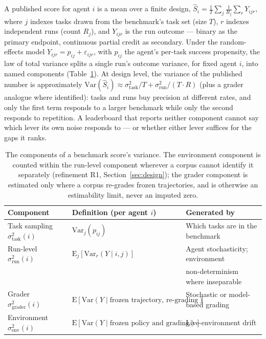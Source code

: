 \documentclass[11pt]{article}
\newcommand{\sT}{\sigma^2_{\mathrm{task}}}
\newcommand{\sR}{\sigma^2_{\mathrm{run}}}
\newcommand{\sG}{\sigma^2_{\mathrm{grader}}}
\begin{document}
A published score for agent $i$ is a mean over a finite design,
$\hat{S}_i = \frac{1}{T}\sum_j \frac{1}{R_j}\sum_r Y_{ijr}$, where $j$
indexes tasks drawn from the benchmark's task set (size $T$), $r$
indexes independent runs (count $R_j$), and $Y_{ijr}$ is the run
outcome --- binary as the primary endpoint, continuous partial credit
as secondary. Under the random-effects model $Y_{ijr} = p_{ij} +
\varepsilon_{ijr}$, with $p_{ij}$ the agent's per-task success
propensity, the law of total variance splits a single run's outcome
variance, for fixed agent $i$, into named components
(Table~\ref{tab:components}). At design level, the variance of the
published number is approximately
$\mathrm{Var}(\hat{S}_i) \approx \sT/T + \sR/(T\cdot R)$ (plus a grader
analogue where identified): tasks and runs buy precision at different
rates, and only the first term responds to a larger benchmark while
only the second responds to repetition. A leaderboard that reports
neither component cannot say which lever its own noise responds to
--- or whether either lever suffices for the gaps it ranks.

\begin{table}[t]
\centering\small
\begin{tabular}{@{}lll@{}}
\toprule
Component & Definition (per agent $i$) & Generated by \\
\midrule
Task sampling $\sT(i)$ & $\mathrm{Var}_j(p_{ij})$ & Which tasks are in the benchmark \\
Run-level $\sR(i)$ & $\mathrm{E}_j[\mathrm{Var}_r(Y\mid i,j)]$ & Agent stochasticity; environment \\
 & & non-determinism where inseparable \\
Grader $\sG(i)$ & $\mathrm{E}[\mathrm{Var}(Y\mid \text{frozen trajectory, re-grading})]$ & Stochastic or model-based grading \\
Environment $\sigma^2_{\mathrm{env}}(i)$ & $\mathrm{E}[\mathrm{Var}(Y\mid \text{frozen policy and grading})]$ & Live-environment drift \\
\bottomrule
\end{tabular}
\caption{The components of a benchmark score's variance. The
environment component is counted within the run-level component
wherever a corpus cannot identify it separately (refinement R1,
Section~\ref{sec:design}); the grader component is estimated only
where a corpus re-grades frozen trajectories, and is otherwise an
estimability limit, never an imputed zero.}
\label{tab:components}
\end{table}
\end{document}
